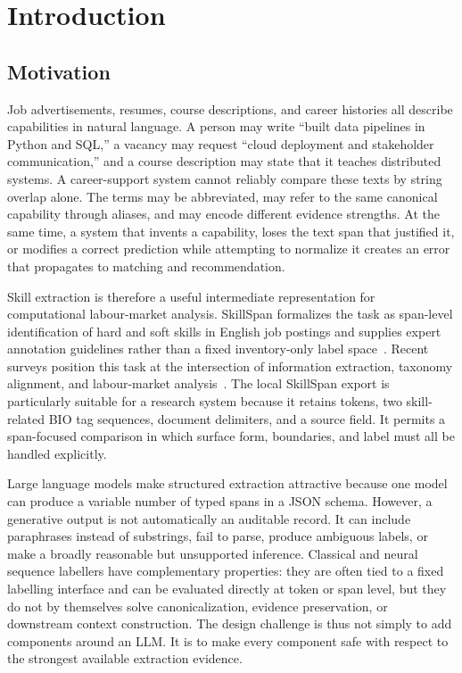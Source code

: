 \chapter{Introduction}
\label{ch:introduction}

\section{Motivation}

Job advertisements, resumes, course descriptions, and career histories all describe capabilities in natural language. A person may write ``built data pipelines in Python and SQL,'' a vacancy may request ``cloud deployment and stakeholder communication,'' and a course description may state that it teaches distributed systems. A career-support system cannot reliably compare these texts by string overlap alone. The terms may be abbreviated, may refer to the same canonical capability through aliases, and may encode different evidence strengths. At the same time, a system that invents a capability, loses the text span that justified it, or modifies a correct prediction while attempting to normalize it creates an error that propagates to matching and recommendation.

Skill extraction is therefore a useful intermediate representation for computational labour-market analysis. SkillSpan formalizes the task as span-level identification of hard and soft skills in English job postings and supplies expert annotation guidelines rather than a fixed inventory-only label space~\cite{zhang2022skillspan}. Recent surveys position this task at the intersection of information extraction, taxonomy alignment, and labour-market analysis~\cite{senger2024survey}. The local SkillSpan export is particularly suitable for a research system because it retains tokens, two skill-related BIO tag sequences, document delimiters, and a source field. It permits a span-focused comparison in which surface form, boundaries, and label must all be handled explicitly.

Large language models make structured extraction attractive because one model can produce a variable number of typed spans in a JSON schema. However, a generative output is not automatically an auditable record. It can include paraphrases instead of substrings, fail to parse, produce ambiguous labels, or make a broadly reasonable but unsupported inference. Classical and neural sequence labellers have complementary properties: they are often tied to a fixed labelling interface and can be evaluated directly at token or span level, but they do not by themselves solve canonicalization, evidence preservation, or downstream context construction. The design challenge is thus not simply to add components around an LLM. It is to make every component safe with respect to the strongest available extraction evidence.

